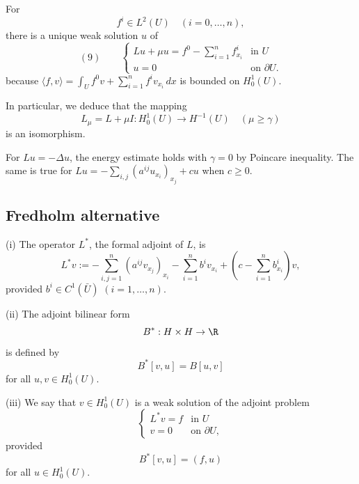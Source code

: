 \begin{remark}
\label{rem:general-rhs-weak-solution-isomorphism}
For
$$f^i \in L^2(U) \quad (i=0,\ldots,n),$$
there is a unique weak solution $u$ of
$$(9) \qquad \begin{cases} Lu + \mu u = f^0 - \sum_{i=1}^n f^i_{x_i} & \text{in } U \\ u = 0 & \text{on } \partial U. \end{cases}$$
because $\langle f,v\rangle = \int_U f^0v + \sum_{i=1}^n f^iv_{x_i}\,dx$ is bounded on $H_0^1(U)$.

In particular, we deduce that the mapping
$$L_\mu = L + \mu I : H_0^1(U) \to H^{-1}(U) \quad (\mu \geq \gamma)$$
is an isomorphism.
\end{remark}

\begin{example}
\label{ex:energy-estimates-gamma-zero-examples}
For $Lu=-\Delta u$, the energy estimate holds with $\gamma=0$ by Poincare inequality. The same is true for $Lu=-\sum_{i,j}(a^{ij}u_{x_i})_{x_j}+cu$ when $c\ge0$.
\end{example}

\subsection{Fredholm alternative}

\begin{definition}
\label{def:formal-adjoint-operator}
(i) The operator $L^*$, the formal adjoint of $L$, is
$$L^*v := -\sum_{i,j=1}^n(a^{ij}v_{x_j})_{x_i} - \sum_{i=1}^n b^iv_{x_i} + \left(c - \sum_{i=1}^n b^i_{x_i}\right)v,$$
provided $b^i \in C^1(\bar U)$ $(i=1,\ldots,n)$.

(ii) The adjoint bilinear form
$$B^* : H \times H \to \R$$
is defined by
$$B^*[v,u] = B[u,v]$$
for all $u,v \in H_0^1(U)$.

(iii) We say that $v \in H_0^1(U)$ is a weak solution of the adjoint problem
$$\begin{cases} L^*v = f & \text{in } U \\ v = 0 & \text{on } \partial U, \end{cases}$$
provided
$$B^*[v,u] = (f,u)$$
for all $u \in H_0^1(U)$.
\end{definition}

